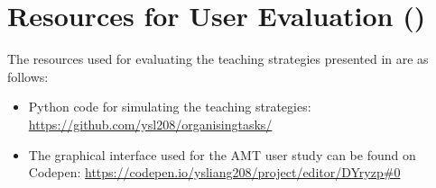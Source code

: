 \chapter{Resources for User Evaluation ()}
\label{app:exp3}
The resources used for evaluating the teaching strategies presented in  are as follows:
\begin{itemize}
	\item Python code for simulating the teaching strategies: \url{https://github.com/ysl208/organisingtasks/}
	\item The graphical interface used for the AMT user study can be found on Codepen:
	\url{https://codepen.io/ysliang208/project/editor/DYryzp#0}
\end{itemize}
%
%
%

